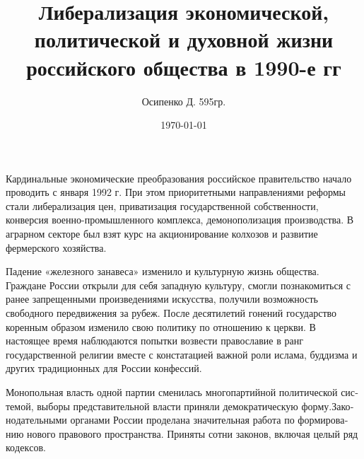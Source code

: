 \documentclass[a4paper, 12pt]{article}
\title{Либерализация экономической, политической и духовной жизни российского общества в 1990-е гг}
\author{Осипенко Д. 595гр.}
\date{\today}
\begin{document}
\sffamily
\maketitle

Кардинальные экономические преобразования российское правительство начало проводить с января 1992 г. При этом приоритетными направлениями реформы стали либерализация цен, приватизация государственной собственности, конверсия военно-промышленного комплекса, демонополизация производства. В аграрном секторе был взят курс на акционирование колхозов и развитие фермерского хозяйства.

Падение «железного занавеса» изменило и культурную жизнь общества. Граждане России открыли для себя западную культуру, смогли познакомиться с ранее запрещенными произведениями искусства, получили возможность свободного передвижения за рубеж. После десятилетий гонений государство коренным образом изменило свою политику по отношению к церкви. В настоящее время наблюдаются попытки возвести православие в ранг государственной религии вместе с констатацией важной роли ислама, буддизма и других традиционных для России конфессий.

Мо­но­поль­ная власть од­ной пар­тии сме­ни­лась мно­го­пар­тий­ной по­ли­ти­че­ской сис­те­мой, вы­бо­ры пред­ста­ви­тель­ной вла­сти при­ня­ли де­мо­кра­ти­че­скую фор­му.За­ко­но­да­тель­ны­ми ор­га­на­ми Рос­сии про­де­ла­на зна­чи­тель­ная ра­бо­та по фор­ми­ро­ва­нию но­во­го пра­во­во­го про­стран­ст­ва. При­ня­ты сот­ни за­ко­нов, вклю­чая це­лый ряд ко­дек­сов.
\end{document}
